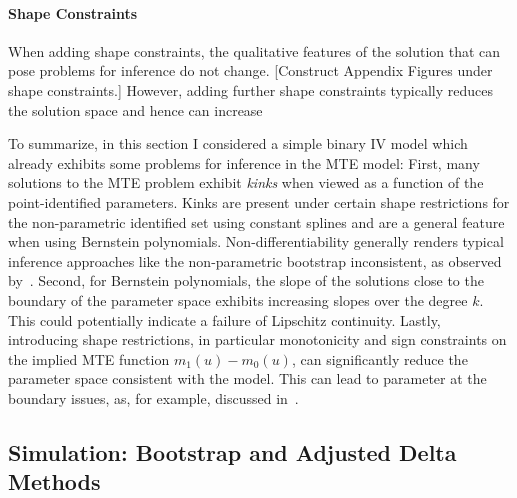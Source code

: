 \documentclass[12pt,a4paper,english]{article} %
\numberwithin{equation}{section}
\theoremstyle{definition}
\theoremstyle{remark}
\theoremstyle{plain}
\begin{document}
\paragraph{Shape Constraints}
When adding shape constraints, the qualitative features of the solution that can pose problems for inference do not change.
[Construct Appendix Figures under shape constraints.]
However, adding further shape constraints typically reduces the solution space and hence can increase

To summarize, in this section I considered a simple binary IV model which already exhibits some problems for inference in the MTE model:
First, many solutions to the MTE problem exhibit \textit{kinks} when viewed as a function of the point-identified parameters.
Kinks are present under certain shape restrictions for the non-parametric identified set using constant splines and are a general feature when using Bernstein polynomials.
Non-differentiability generally renders typical inference approaches like the non-parametric bootstrap inconsistent, as observed by~\cite{dumbgen1993nondifferentiable}.
Second, for Bernstein polynomials, the slope of the solutions close to the boundary of the parameter space exhibits increasing slopes over the degree $k$.
This could potentially indicate a failure of Lipschitz continuity.
Lastly, introducing shape restrictions, in particular monotonicity and sign constraints on the implied MTE function $m_1(u) - m_0(u)$, can significantly reduce the parameter space consistent with the model.
This can lead to parameter at the boundary issues, as, for example, discussed in~\cite{andrews1999estimation}.

\subsection{Simulation: Bootstrap and Adjusted Delta Methods}
\end{document}
